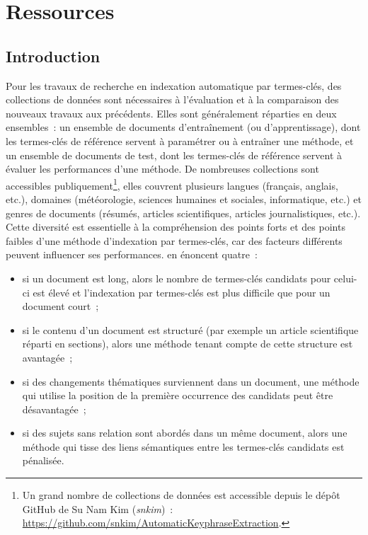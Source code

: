 \chapter{Ressources}
\label{chap:main-data_description}

  \section{Introduction}
  \label{sec:main-data_description-introduction}
    Pour les travaux de recherche en indexation automatique par termes-clés, des
    collections de données sont nécessaires à l'évaluation et à la comparaison
    des nouveaux travaux aux précédents. Elles sont généralement réparties en
    deux ensembles~: un ensemble de documents d'entraînement (ou
    d'apprentissage), dont les termes-clés de référence servent à paramétrer ou
    à entraîner une méthode, et un ensemble de documents de test, dont les
    termes-clés de référence servent à évaluer les performances d'une méthode.
    De nombreuses collections sont accessibles publiquement\footnote{Un grand
    nombre de collections de données est accessible depuis le dépôt GitHub de Su
    Nam Kim (\textit{snkim})~:
    \url{https://github.com/snkim/AutomaticKeyphraseExtraction}.}, elles
    couvrent plusieurs langues (français, anglais, etc.), domaines
    (météorologie, sciences humaines et sociales, informatique, etc.) et genres
    de documents (résumés, articles scientifiques, articles journalistiques,
    etc.). Cette diversité est essentielle à la compréhension des points forts
    et des points faibles d'une méthode d'indexation par termes-clés, car des
    facteurs différents peuvent influencer ses performances.
     en énoncent quatre~:
    \begin{itemize}
      \item{si un document est long, alors le nombre de termes-clés candidats
            pour celui-ci est élevé et l'indexation par termes-clés est plus
            difficile que pour un document court~;}
      \item{si le contenu d'un document est structuré (par exemple un article
            scientifique réparti en sections), alors une méthode tenant compte
            de cette structure est avantagée~;}
      \item{si des changements thématiques surviennent dans un document, une
            méthode qui utilise la position de la première occurrence des
            candidats peut être désavantagée~;}
      \item{si des sujets sans relation sont abordés dans un même document,
            alors une méthode qui tisse des liens sémantiques entre les
            termes-clés candidats est pénalisée.}
    \end{itemize}
